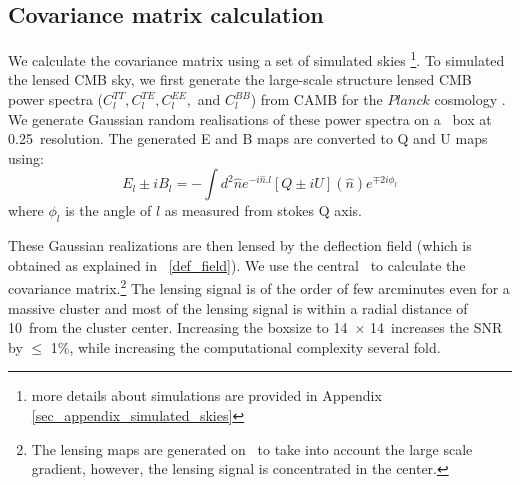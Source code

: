 \subsection{Covariance matrix calculation}
\label{sec_covmat}

 We calculate the covariance matrix using a set of simulated skies \footnote{more details about simulations are provided in Appendix \ref{sec_appendix_simulated_skies}}. 
 To simulated the lensed CMB sky, we first generate the large-scale structure lensed CMB power spectra ($C^{TT}_{l}, C^{TE}_{l}, C^{EE}_{l},$ and $C^{BB}_{l}$) from CAMB for the $Planck$ cosmology \citep{planck15-13}.  
 We generate Gaussian random realisations of these power spectra on a \mediumboxsize\ box at 0.25\am\ resolution. 
The generated E and B maps are converted to Q and U maps using:
 \begin{equation}
 E_{l} \pm i B_{l} = - \int d^{2} \hat{n} e^{-i \hat{n}. l}[Q \pm iU] (\hat{n}) e^{\mp 2 i\phi_{l}}  
 \label{eq:coord_trans}
 \end{equation}
 where $\phi_{l}$ is the angle of $l$ as measured from stokes Q axis.
 

 These Gaussian realizations are then lensed by the deflection field (which is obtained as explained in ~\ref{def_field}). 
 We use the central \smallboxsize\ to calculate the covariance matrix.\footnote{The lensing maps are generated on \mediumboxsize\ to take into account the large scale gradient, however, the lensing signal is concentrated in the center.}
 The lensing signal is of the order of few arcminutes even for a massive cluster and most of the lensing signal is within a radial distance of  10\am\ from the cluster center.
Increasing the boxsize to 14\am\ $\times$ 14\am\ increases the SNR by $\le$ 1\%, while increasing the computational complexity several fold.

